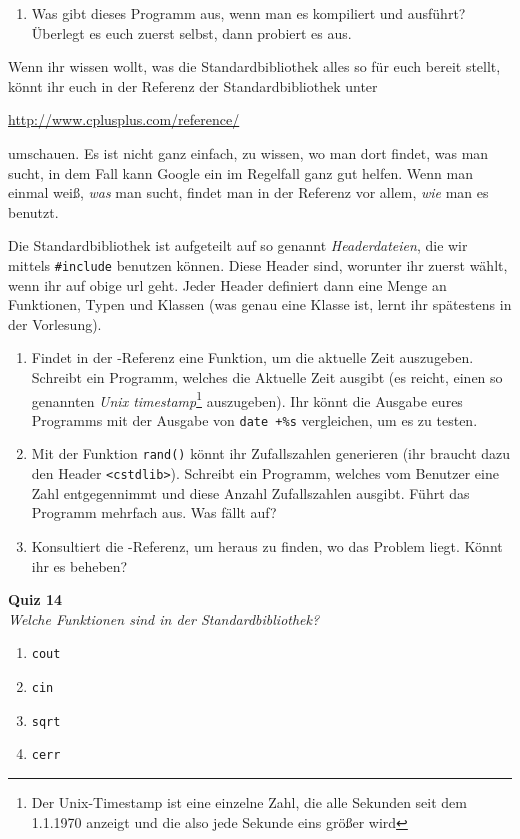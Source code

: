 \begin{praxis}
    \begin{enumerate}
        \item Was gibt dieses Programm aus, wenn man es kompiliert und ausführt?
              Überlegt es euch zuerst selbst, dann probiert es aus.
    \end{enumerate}

    Wenn ihr wissen wollt, was die Standardbibliothek alles so für euch bereit
    stellt, könnt ihr euch in der Referenz der Standardbibliothek unter

    \url{http://www.cplusplus.com/reference/}

    umschauen. Es ist nicht ganz einfach, zu wissen, wo man dort findet, was man
    sucht, in dem Fall kann Google ein im Regelfall ganz gut helfen. Wenn man
    einmal weiß, \emph{was} man sucht, findet man in der Referenz vor allem,
    \emph{wie} man es benutzt.

    Die Standardbibliothek ist aufgeteilt auf so genannt \emph{Headerdateien}, die
    wir mittels \texttt{\#include} benutzen können. Diese Header sind, worunter ihr
    zuerst wählt, wenn ihr auf obige url geht. Jeder Header definiert dann eine
    Menge an Funktionen, Typen und Klassen (was genau eine Klasse ist, lernt ihr
    spätestens in der Vorlesung).

    \begin{enumerate}[resume]
        \item Findet in der \Cpp-Referenz eine Funktion, um die aktuelle Zeit
              auszugeben. Schreibt ein Programm, welches die Aktuelle Zeit ausgibt
              (es reicht, einen so genannten \emph{Unix timestamp}\footnote{Der
                  Unix-Timestamp ist eine einzelne Zahl, die alle Sekunden seit dem
                  1.1.1970 anzeigt und die also jede Sekunde eins größer wird} auszugeben).
              Ihr könnt die Ausgabe eures Programms mit der Ausgabe von \texttt{date
                  +\%s} vergleichen, um es zu testen.
        \item Mit der Funktion \texttt{rand()} könnt ihr Zufallszahlen generieren
              (ihr braucht dazu den Header \texttt{<cstdlib>}). Schreibt ein
              Programm, welches vom Benutzer eine Zahl entgegennimmt und diese Anzahl
              Zufallszahlen ausgibt. Führt das Programm mehrfach aus. Was fällt auf?
        \item Konsultiert die \Cpp-Referenz, um heraus zu finden, wo das Problem
              liegt. Könnt ihr es beheben?
    \end{enumerate}
\end{praxis}



\newpage

\textbf{Quiz 14}\\
\textit{Welche Funktionen sind in der Standardbibliothek?}
\begin{enumerate}[label=\alph*)]
    \item \texttt{cout}
    \item \texttt{cin}
    \item \texttt{sqrt}
    \item \texttt{cerr}
\end{enumerate}
